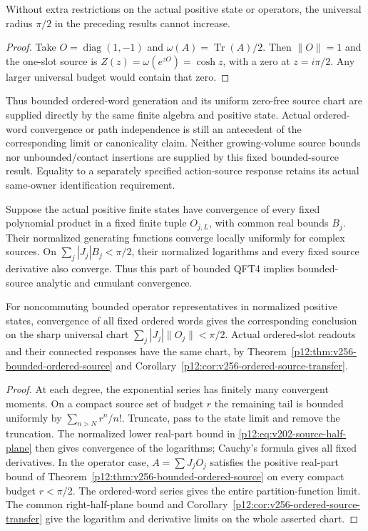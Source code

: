 \documentclass[12pt,a4paper]{article}
\begin{document}
\begin{proposition}
\label{p12:prop:v256-sharp-ordered-budget}
Without extra restrictions on the actual positive state or operators,
the universal radius $\pi/2$ in the preceding results cannot increase.
\end{proposition}
\begin{proof}
Take $O=\operatorname{diag}(1,-1)$ and
$\omega(A)=\operatorname{Tr}(A)/2$.  Then $\|O\|=1$ and the one-slot
source is $Z(z)=\omega(e^{zO})=\cosh z$, with a zero at $z=i\pi/2$.
Any larger universal budget would contain that zero.
\end{proof}

Thus bounded ordered-word generation and its uniform zero-free source
chart are supplied directly by the same finite algebra and positive
state.  Actual ordered-word convergence or path independence is still
an antecedent of the corresponding limit or canonicality claim.
Neither growing-volume source bounds nor unbounded/contact insertions
are supplied by this fixed bounded-source result.  Equality to a
separately specified action-source response retains its actual
same-owner identification requirement.


\begin{theorem}
\label{p12:thm:v202-bounded-source-inheritance}
Suppose the actual positive finite states have convergence of every
fixed polynomial product in a fixed finite tuple $O_{j,L}$, with common
real bounds $B_j$. Their normalized generating functions converge
locally uniformly for complex sources. On
$\sum_j|J_j|B_j<\pi/2$, their normalized logarithms and every fixed
source derivative also converge. Thus this part of bounded QFT4 implies
bounded-source analytic and cumulant convergence.

For noncommuting bounded operator representatives in normalized positive
states, convergence of all fixed ordered words gives the corresponding
conclusion on the sharp universal chart $\sum_j|J_j|\|O_j\|<\pi/2$.
Actual ordered-slot readouts and their connected responses have the same
chart, by Theorem~\ref{p12:thm:v256-bounded-ordered-source} and
Corollary~\ref{p12:cor:v256-ordered-source-transfer}.
\end{theorem}
\begin{proof}
At each degree, the exponential series has finitely many convergent
moments. On a compact source set of budget $r$ the remaining tail is
bounded uniformly by $\sum_{n>N}r^n/n!$. Truncate, pass to the state
limit and remove the truncation. The normalized lower real-part bound
in \eqref{p12:eq:v202-source-half-plane} then gives convergence of the
logarithms; Cauchy's formula gives all fixed derivatives. In the operator
case, $A=\sum J_jO_j$ satisfies the positive real-part bound
of Theorem~\ref{p12:thm:v256-bounded-ordered-source} on every
compact budget $r<\pi/2$.  The ordered-word series gives the entire
partition-function limit.  The common right-half-plane bound and
Corollary~\ref{p12:cor:v256-ordered-source-transfer} give the
logarithm and derivative limits on the whole asserted chart.
\end{proof}
\end{document}
